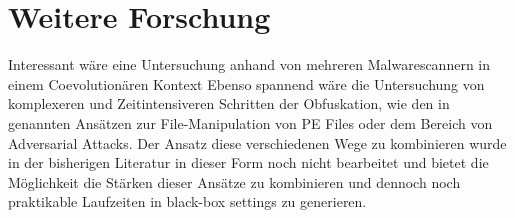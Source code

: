 \section{Weitere Forschung}
Interessant wäre eine Untersuchung anhand von mehreren Malwarescannern in einem Coevolutionären Kontext
Ebenso spannend wäre die Untersuchung von komplexeren und Zeitintensiveren Schritten der Obfuskation, wie den in \cite{demetrio_2024_formalizing} genannten Ansätzen zur File-Manipulation von PE Files oder dem Bereich von Adversarial Attacks. Der Ansatz diese verschiedenen Wege zu kombinieren wurde in der bisherigen Literatur in dieser Form noch nicht bearbeitet und bietet die Möglichkeit die Stärken dieser Ansätze zu kombinieren und dennoch noch praktikable Laufzeiten in black-box settings zu generieren.